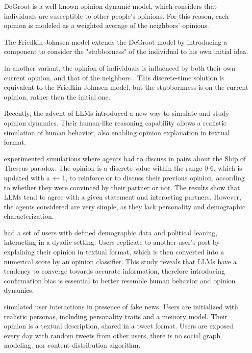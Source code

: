 DeGroot is a well-known opinion dynamic model, which considers that individuals are susceptible to other people's opinions. For this reason, each opinion is modeled as a weighted average of the neighbors' opinions.

The Friedkin-Johnsen model \cite{friedkin_1990} extends the DeGroot model by introducing a component to consider the "stubborness" of the individual to his own initial idea. 

In another variant, the opinion of individuals is influenced by both their own current opinion, and that of the neighbors \cite{Ye2018Opinion, Liu_2018}. This discrete-time solution is equivalent to the Friedkin-Johnsen model, but the stubbornness is on the current opinion, rather then the initial one.


Recently, the advent of LLMs introduced a new way to simulate and study opinion dynamics.
Their human-like reasoning capability allows a realistic simulation of human behavior, also enabling opinion explanation in textual format.

\citet{cau2025languagedrivenopiniondynamicsagentbased} experimented simulations where agents had to discuss in pairs about the Ship of Theseus paradox.
The opinion is a discrete value within the range 0-6, which is updated with a +- 1,  to reinforce or to discuss their previous opinion, according to whether they were convinced by their partner or not.
The results show that LLMs tend to agree with a given statement and interacting partners. However, the agents considered are very simple, as they lack personality and demographic characterization.

\citet{chuang2024simulatingopiniondynamicsnetworks} had a set of users with defined demographic data and political leaning, interacting in a dyadic setting. Users replicate to another user's post by explaining their opinion in textual format, which is then converted into a numerical score by an opinion classifier.
This study reveals that LLMs have a tendency to converge towards accurate information, therefore introducing confirmation bias is essential to better resemble human behavior and opinion dynamics.

\citet{Liu_2024} simulated user interactions in presence of fake news. Users are initialized with realistic personas, including personality traits and a memory model. Their opinion is a textual description, shared in a tweet format. 
Users are exposed every day with random tweets from other users, there is no social graph modeling, nor content distribution algorithm.

